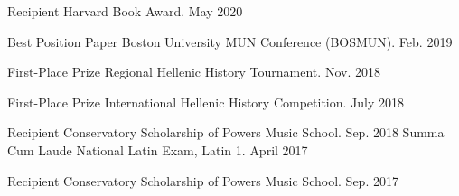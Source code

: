 



\begin{cvhonors}

  \cvhonor
    {Recipient}
    {Harvard Book Award.}
    {May 2020}

  \cvhonor
    {Best Position Paper} %
    {Boston University MUN Conference (BOSMUN).} %
    {Feb. 2019} %

  \cvhonor
    {First-Place Prize} %
    {Regional Hellenic History Tournament.} %
    {Nov. 2018} %

  \cvhonor
    {First-Place Prize} %
    {International Hellenic History Competition.} %
    {July 2018} %

  \cvhonor
    {Recipient}
    {Conservatory Scholarship of Powers Music School.}
    {Sep. 2018}
  \cvhonor
    {Summa Cum Laude}
    {National Latin Exam, Latin 1.}
    {April 2017}

  \cvhonor
    {Recipient}
    {Conservatory Scholarship of Powers Music School.}
    {Sep. 2017}
    
\end{cvhonors}



